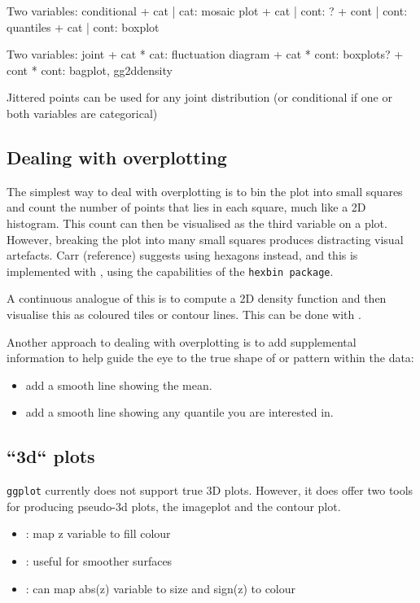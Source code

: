 Two variables: conditional
+ cat  | cat:  mosaic plot
+ cat  | cont: ?
+ cont | cont: quantiles
+ cat  | cont: boxplot

Two variables: joint
+ cat  * cat:  fluctuation diagram
+ cat  * cont: boxplots?
+ cont * cont: bagplot, gg2ddensity

Jittered points can be used for any joint distribution (or conditional if one or both variables are categorical)

\subsection{Dealing with overplotting}\label{sec:overplotting}

The simplest way to deal with overplotting is to bin the plot into small squares and count the number of points that lies in each square, much like a 2D histogram.  This count can then be visualised as the third variable on a plot.  However, breaking the plot into many small squares produces distracting visual artefacts.  Carr (reference) suggests using hexagons instead, and this is implemented with , using the capabilities of the {\tt hexbin package}.

A continuous analogue of this is to compute a 2D density function and then visualise this as coloured tiles or contour lines.  This can be done with .

Another approach to dealing with overplotting is to add supplemental information to help guide the eye to the true shape of or pattern within the data:

\begin{itemize}
	\item {} add a smooth line showing the mean.
	\item {} add a smooth line showing any quantile you are interested in.
\end{itemize}

\subsection{``3d`` plots}\label{sub:_3d_plots}

{\tt ggplot} currently does not support true 3D plots.  However, it does offer two tools for producing pseudo-3d plots, the imageplot and the contour plot.

\begin{itemize}
	\item {}: map z variable to fill colour
	\item {}: useful for smoother surfaces
	\item {}: can map abs(z) variable to size and sign(z) to colour
\end{itemize}

